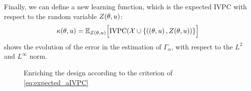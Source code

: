 \documentclass[../../Main_ManuscritThese.tex]{subfiles}
\newcommand\imgpath{/home/victor/acadwriting/Manuscrit/Text/Chapter4/img/}
\begin{document}
Finally, we can define a new learning function, which is the expected $\mathrm{IVPC}$ with respect to the random variable $Z(\theta, u)$:
\begin{equation}
  \label{eq:expected_aIVPC}
  \kappa(\theta, u) = \mathbb{E}_{Z(\theta, u)}\Big[\mathrm{IVPC}(\mathcal{X} \cup \{   \left(\left(\theta, u \right), Z(\theta, u) \right)  \}     \Big]
\end{equation}
 shows the evolution of the error in the estimation of $\Gamma_{\alpha}$, with respect to the $L^2$ and $L^{\infty}$ norm.
\begin{figure}[ht]
  \centering
  
  \caption{\label{fig:IVPC_enrichment} Enriching the design according to the criterion of \cref{eq:expected_aIVPC}}
\end{figure}




\end{document}
